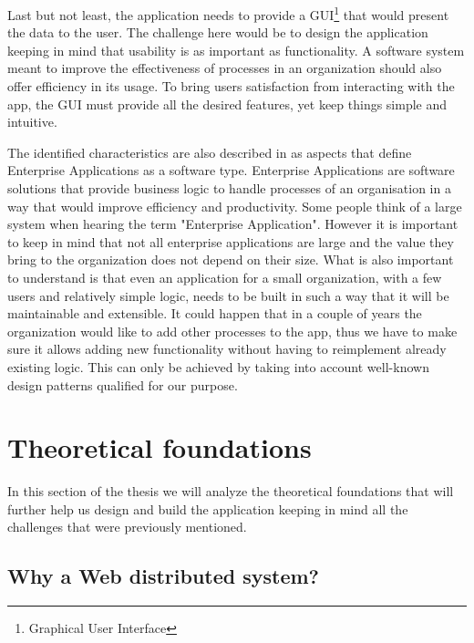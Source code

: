 Last but not least, the application needs to provide a GUI\footnote{Graphical User Interface} that would present the data to the user. The challenge here would be to design the application keeping in mind that usability is as important as functionality. A software system meant to improve the effectiveness of processes in an organization should also offer efficiency in its usage. To bring users satisfaction from interacting with the app, the GUI must provide all the desired features, yet keep things simple and intuitive.

The identified characteristics are also described in \cite{patternsOfEnterpriseApplicationArchitecture} as aspects that define Enterprise Applications as a software type. Enterprise Applications are software solutions that provide business logic to handle processes of an organisation in a way that would improve efficiency and productivity. Some people think of a large system when hearing the term "Enterprise Application". However it is important to keep in mind that not all enterprise applications are large and the value they bring to the organization does not depend on their size. What is also important to understand is that even an application for a small organization, with a few users and relatively simple logic, needs to be built in such a way that it will be maintainable and extensible. It could happen that in a couple of years the organization would like to add other processes to the app, thus we have to make sure it allows adding new functionality without having to reimplement already existing logic. This can only be achieved by taking into account well-known design patterns qualified for our purpose.



\section{Theoretical foundations}
\label{section:theoreticalFoundations}

In this section of the thesis we will analyze the theoretical foundations that will further help us design and build the application keeping in mind all the challenges that were previously mentioned.


\subsection{Why a Web distributed system?}
\label{subsection:whyAWebDistributedSystem}

